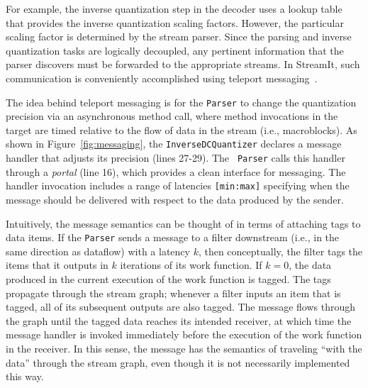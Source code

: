 For example, the inverse quantization step in the decoder uses a
lookup table that provides the inverse quantization scaling factors.
However, the particular scaling factor is determined by the stream
parser. Since the parsing and inverse quantization tasks are logically
decoupled, any pertinent information that the parser discovers must be
forwarded to the appropriate streams.  In StreamIt, such
communication is conveniently accomplished using teleport
messaging~\cite{thies05ppopp}.

The idea behind teleport messaging is for the {\tt Parser} to change
the quantization precision via an asynchronous method call, where
method invocations in the target are timed relative to the flow of
data in the stream (i.e., macroblocks). As shown in
Figure~\ref{fig:messaging}, the {\tt InverseDCQuantizer} declares a
message handler that adjusts its precision (lines 27-29). The {\tt
Parser} calls this handler through a {\it portal} (line 16), which
provides a clean interface for messaging.  The handler invocation
includes a range of latencies {\tt [min:max]} specifying when the
message should be delivered with respect to the data produced by the
sender.

Intuitively, the message semantics can be thought of in terms of
attaching tags to data items.  If the {\tt Parser} sends a message to
a filter downstream (i.e., in the same direction as dataflow) with a
latency $k$, then conceptually, the filter tags the items that it
outputs in $k$ iterations of its work function. If $k=0$, the data
produced in the current execution of the work function is tagged. The
tags propagate through the stream graph; whenever a filter inputs an
item that is tagged, all of its subsequent outputs are also
tagged. The message flows through the graph until the tagged data
reaches its intended receiver, at which time the message handler is
invoked immediately before the execution of the work function in the
receiver.  In this sense, the message has the semantics of traveling
``with the data'' through the stream graph, even though it is not
necessarily implemented this way.


